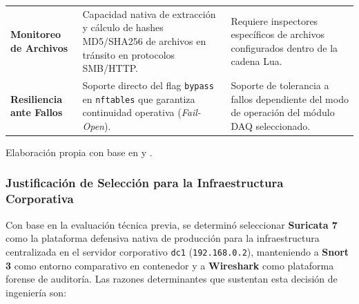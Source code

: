 \begin{table}[H]
{\begin{tablaAPA}
\begin{tabular}{L{2.8cm}L{5.8cm}L{5.8cm}}
  \textbf{Monitoreo de Archivos} & Capacidad nativa de extracción y cálculo de hashes MD5/SHA256 de archivos en tránsito en protocolos SMB/HTTP. & Requiere inspectores específicos de archivos configurados dentro de la cadena Lua. \\
  \textbf{Resiliencia ante Fallos} & Soporte directo del flag \texttt{bypass} en \texttt{nftables} que garantiza continuidad operativa (\textit{Fail-Open}). & Soporte de tolerancia a fallos dependiente del modo de operación del módulo DAQ seleccionado. \\
  \bottomrule
  \end{tabular}
  \end{tablaAPA}%
}{Elaboración propia con base en \cite{oisf_suricata_2024} y \cite{cisco_snort3_2024}.}
\end{table}

\subsubsection{Justificación de Selección para la Infraestructura Corporativa}

Con base en la evaluación técnica previa, se determinó seleccionar \textbf{Suricata 7} como la plataforma defensiva nativa de producción para la infraestructura centralizada en el servidor corporativo \texttt{dc1} (\texttt{192.168.0.2}), manteniendo a \textbf{Snort 3} como entorno comparativo en contenedor y a \textbf{Wireshark} como plataforma forense de auditoría. Las razones determinantes que sustentan esta decisión de ingeniería son:

